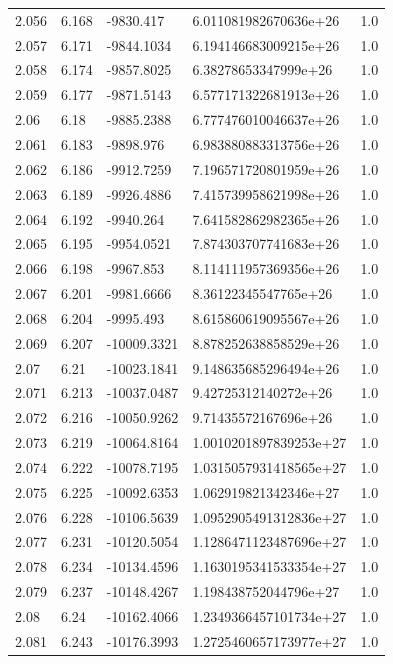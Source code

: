 \begin{tabular}{lllll}
2.056 & 6.168 & -9830.417 & 6.011081982670636e+26 & 1.0 \\
2.057 & 6.171 & -9844.1034 & 6.194146683009215e+26 & 1.0 \\
2.058 & 6.174 & -9857.8025 & 6.38278653347999e+26 & 1.0 \\
2.059 & 6.177 & -9871.5143 & 6.577171322681913e+26 & 1.0 \\
2.06 & 6.18 & -9885.2388 & 6.777476010046637e+26 & 1.0 \\
2.061 & 6.183 & -9898.976 & 6.983880883313756e+26 & 1.0 \\
2.062 & 6.186 & -9912.7259 & 7.196571720801959e+26 & 1.0 \\
2.063 & 6.189 & -9926.4886 & 7.415739958621998e+26 & 1.0 \\
2.064 & 6.192 & -9940.264 & 7.641582862982365e+26 & 1.0 \\
2.065 & 6.195 & -9954.0521 & 7.874303707741683e+26 & 1.0 \\
2.066 & 6.198 & -9967.853 & 8.114111957369356e+26 & 1.0 \\
2.067 & 6.201 & -9981.6666 & 8.36122345547765e+26 & 1.0 \\
2.068 & 6.204 & -9995.493 & 8.615860619095567e+26 & 1.0 \\
2.069 & 6.207 & -10009.3321 & 8.878252638858529e+26 & 1.0 \\
2.07 & 6.21 & -10023.1841 & 9.148635685296494e+26 & 1.0 \\
2.071 & 6.213 & -10037.0487 & 9.42725312140272e+26 & 1.0 \\
2.072 & 6.216 & -10050.9262 & 9.71435572167696e+26 & 1.0 \\
2.073 & 6.219 & -10064.8164 & 1.0010201897839253e+27 & 1.0 \\
2.074 & 6.222 & -10078.7195 & 1.0315057931418565e+27 & 1.0 \\
2.075 & 6.225 & -10092.6353 & 1.062919821342346e+27 & 1.0 \\
2.076 & 6.228 & -10106.5639 & 1.0952905491312836e+27 & 1.0 \\
2.077 & 6.231 & -10120.5054 & 1.1286471123487696e+27 & 1.0 \\
2.078 & 6.234 & -10134.4596 & 1.1630195341533354e+27 & 1.0 \\
2.079 & 6.237 & -10148.4267 & 1.198438752044796e+27 & 1.0 \\
2.08 & 6.24 & -10162.4066 & 1.2349366457101734e+27 & 1.0 \\
2.081 & 6.243 & -10176.3993 & 1.2725460657173977e+27 & 1.0 \\

\end{tabular}
